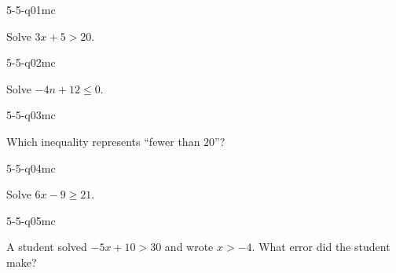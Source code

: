 

\begin{practiceQuestion}{5-5-q01}{mc}
\begin{questionText}
Solve $3x + 5 > 20$.
\end{questionText}
\end{practiceQuestion}

\begin{practiceQuestion}{5-5-q02}{mc}
\begin{questionText}
Solve $-4n + 12 \leq 0$.
\end{questionText}
\end{practiceQuestion}

\begin{practiceQuestion}{5-5-q03}{mc}
\begin{questionText}
Which inequality represents ``fewer than $20$''?
\end{questionText}
\end{practiceQuestion}

\begin{practiceQuestion}{5-5-q04}{mc}
\begin{questionText}
Solve $6x - 9 \geq 21$.
\end{questionText}
\end{practiceQuestion}

\begin{practiceQuestion}{5-5-q05}{mc}
\begin{questionText}
A student solved $-5x + 10 > 30$ and wrote $x > -4$. What error did the student make?
\end{questionText}
\end{practiceQuestion}

